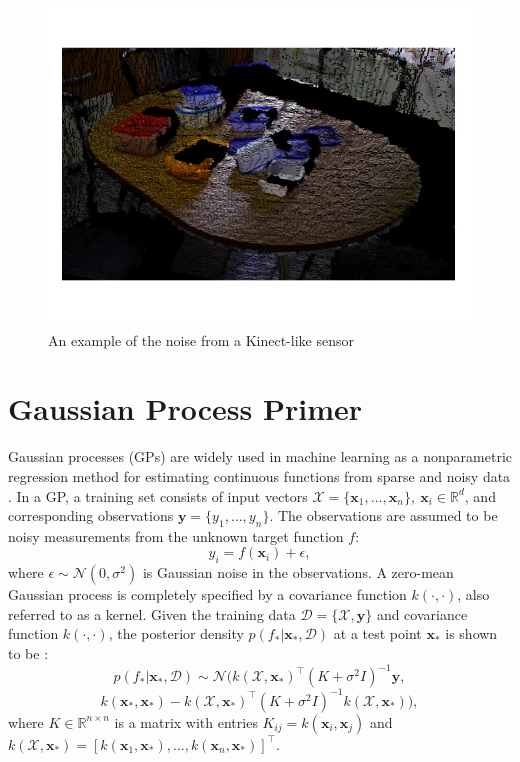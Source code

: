 \documentclass[letterpaper, 10 pt, conference]{ieeeconf}  %
\newcommand{\by}{\mathbf{y}}
\newcommand{\bx}{\mathbf{x}}
\newcommand{\mX}{\mathcal{X}}
\newcommand{\mD}{\mathcal{D}}
\newcommand{\mN}{\mathcal{N}}
\begin{document}
\begin{figure}[ht!]
\centering
\includegraphics[scale = 0.3]{figures/Slide2.jpg}
\caption{An example of the noise from a Kinect-like sensor}
\vspace*{-10pt}
\label{fig:noisy data}
\end{figure}


\section{Gaussian Process Primer}
 Gaussian processes (GPs) are widely used in machine learning as a nonparametric regression method for estimating continuous functions from sparse and noisy data \cite{rasmussen2006}.
In a GP, a training set consists of input vectors $\mX = \{\bx_1, \ldots, \bx_n\}, ~\bx_i \in \mathbb{R}^d$, and corresponding observations $\by = \{y_1, \ldots, y_n\}$.
The observations are assumed to be noisy measurements from the unknown target function $f$:
\begin{equation}
y_i = f(\bx_i) + \epsilon,
\end{equation}
where $\epsilon \sim \mN(0,\sigma^2)$ is Gaussian noise in the observations.
A zero-mean Gaussian process is completely specified by a covariance function $k(\cdot,\cdot)$, also referred to as a kernel.
Given the training data $\mD = \{\mX, \by\}$ and covariance function $k(\cdot,\cdot)$, the posterior density $p(f_*|\bx_*,\mD)$ at a test point $\bx_{*}$ is shown to be \cite{rasmussen2006}:
\begin{equation}
  p(f_*|\bx_*,\mD) 
  \sim 
  \mN\big(k(\mX,\bx_*)^{\intercal}(K + \sigma^2I)^{-1}\by,
\end{equation}
\[
  k(\bx_*,\bx_*)-k(\mX,\bx_*)^{\intercal}(K+\sigma^2I)^{-1}k(\mX,\bx_*)\big), \label{eq:GPposterior}
\]
where $K \in \mathbb{R}^{n \times n}$ is a matrix with entries $K_{ij} = k(\bx_i,\bx_j)$ and $k(\mX,\bx_*) = [k(\bx_1,\bx_*),\ldots,k(\bx_n,\bx_*)]^{\intercal}$. 
\end{document}
